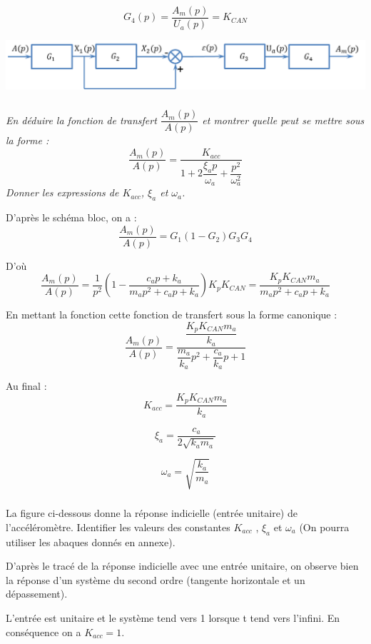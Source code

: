 \documentclass[10pt,fleqn]{article} %
\begin{document}
\begin{multicols}{2}
\begin{corrige}
$$
G_4(p) = \dfrac{A_m(p)}{U_a(p)} = K_{CAN}
$$

\end{corrige}
\else
\fi

\begin{center}
\includegraphics[width=.8\linewidth]{images/schema_bloc.png}
\end{center}

\subparagraph{}
\textit{En déduire la fonction de transfert $\dfrac{A_m(p)}{A(p)}$ et montrer quelle peut se mettre sous la
forme :}
$$
\dfrac{A_m(p)}{A(p)} = \dfrac{K_{acc}}{1+2\dfrac{\xi_a p}{\omega_a} + \dfrac{p^2}{\omega_a^2}}
$$
\textit{Donner les expressions de $K_{acc}$, $\xi_a$ et $\omega_a$.}

\ifprof
\begin{corrige}

D'après le schéma bloc, on a : 
$$
 \dfrac{A_m(p)}{A(p)} = G_1 \left(1 - G_2 \right) G_3 G_4 
$$

D'où 
$$
 \dfrac{A_m(p)}{A(p)} = \dfrac{1}{p^2} \left( 1- \dfrac{c_a p + k_a}{m_a p^2
+c_a p + k_a} \right)  K_p K_{CAN} =
\dfrac{K_p K_{CAN} m_a}{m_a p^2 +c_a p + k_a}
$$

En mettant la fonction cette fonction de transfert sous la forme canonique :
$$
\dfrac{A_m(p)}{A(p)} = \dfrac{\dfrac{K_p K_{CAN} m_a}{k_a}}{\dfrac{m_a}{k_a}p^2
+ \dfrac{c_a}{k_a}p+1}
$$

Au final : 
$$
K_{acc} = \dfrac{K_p K_{CAN} m_a}{k_a}
$$

$$
\xi_a = \dfrac{c_a}{2\sqrt{k_a m_a}}
$$

$$
\omega_a = \sqrt{\dfrac{k_a}{m_a}}
$$
\end{corrige}
\else
\fi

\subparagraph{}
La figure ci-dessous donne la réponse indicielle (entrée unitaire) de l'accéléromètre.
Identifier les valeurs des constantes $K_{acc}$ , $\xi_a$ et $\omega_a$ (On pourra utiliser les abaques donnés en annexe).
\ifprof
\begin{corrige}
D'après le tracé de la réponse indicielle avec une entrée unitaire, on observe
bien la réponse d'un système du second ordre (tangente horizontale et un
dépassement).

L'entrée est unitaire et le système tend vers 1 lorsque t tend vers l'infini.
En conséquence on a $K_{acc}=1$.


\end{corrige}
\end{multicols}
\end{document}
